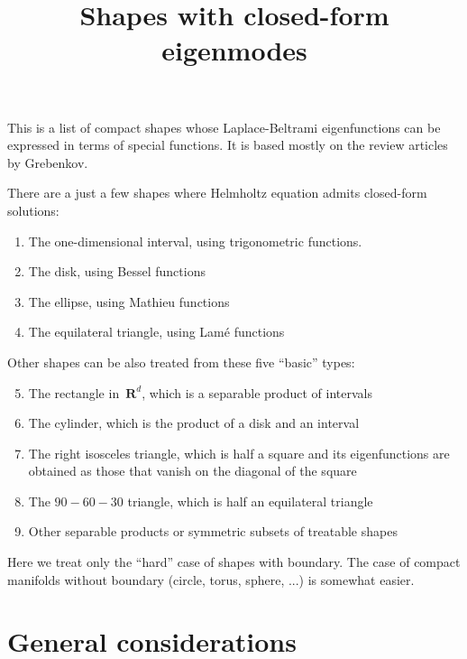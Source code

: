 \title{Shapes with closed-form eigenmodes}

\newcommand{\R}{\mathbf{R}}
\newcommand{\Z}{\mathbf{Z}}
\newcommand{\Q}{\mathbf{Q}}
\newcommand{\C}{\mathbf{C}}
\newcommand{\U}{\mathbf{U}}
\newcommand{\T}{\mathbf{T}}
\newcommand{\ud}{\mathrm{d}}
\newcommand{\x}{\mathbf{x}}


This is a list of compact shapes whose Laplace-Beltrami
eigenfunctions can be expressed in terms of special functions.  It is
based mostly on the review articles by Grebenkov.

There are a just a few shapes where Helmholtz equation admits
closed-form solutions:

\begin{enumerate}
	\item The one-dimensional interval, using trigonometric functions.
	\item The disk, using Bessel functions
	\item The ellipse, using Mathieu functions
	\item The equilateral triangle, using Lamé functions
\end{enumerate}

Other shapes can be also treated from these five ``basic'' types:

\begin{enumerate}
		\setcounter{enumi}{4}
	\item The rectangle in~$\R^d$, which is a separable product of
		intervals
	\item The cylinder, which is the product of a disk and an interval
	\item The right isosceles triangle, which is half a square and its
		eigenfunctions are obtained as those that vanish on the
		diagonal of the square
	\item The $90-60-30$ triangle, which is half an equilateral
		triangle
	\item Other separable products or symmetric subsets of treatable
		shapes
\end{enumerate}

Here we treat only the ``hard'' case of shapes with boundary.  The
case of compact manifolds without boundary
(circle, torus, sphere, ...) is somewhat easier.

\clearpage
\section{General considerations}

